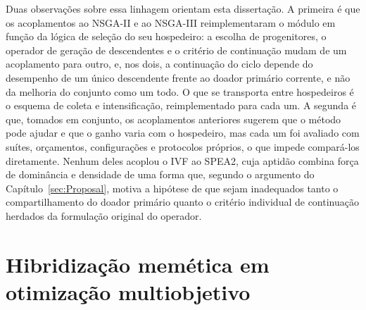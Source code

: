 
Duas observações sobre essa linhagem orientam esta dissertação. A primeira é que os acoplamentos ao NSGA-II e ao NSGA-III reimplementaram o módulo em função da lógica de seleção do seu hospedeiro: a escolha de progenitores, o operador de geração de descendentes e o critério de continuação mudam de um acoplamento para outro, e, nos dois, a continuação do ciclo depende do desempenho de um único descendente frente ao doador primário corrente, e não da melhoria do conjunto como um todo. O que se transporta entre hospedeiros é o esquema de coleta e intensificação, reimplementado para cada um. A segunda é que, tomados em conjunto, os acoplamentos anteriores sugerem que o método pode ajudar e que o ganho varia com o hospedeiro, mas cada um foi avaliado com suítes, orçamentos, configurações e protocolos próprios, o que impede compará-los diretamente. Nenhum deles acoplou o IVF ao SPEA2, cuja aptidão combina força de dominância e densidade de uma forma que, segundo o argumento do Capítulo~\ref{sec:Proposal}, motiva a hipótese de que sejam inadequados tanto o compartilhamento do doador primário quanto o critério individual de continuação herdados da formulação original do operador.

\section{Hibridização memética em otimização multiobjetivo}

